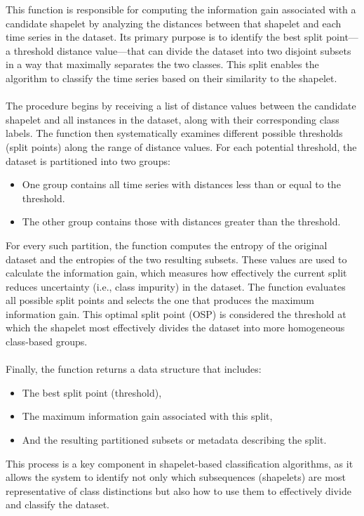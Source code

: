 \noindent This function is responsible for computing the information gain associated with a candidate shapelet by analyzing the distances between that shapelet and each time series in the dataset. Its primary purpose is to identify the best split point—a threshold distance value—that can divide the dataset into two disjoint subsets in a way that maximally separates the two classes. This split enables the algorithm to classify the time series based on their similarity to the shapelet.\\
\\
The procedure begins by receiving a list of distance values between the candidate shapelet and all instances in the dataset, along with their corresponding class labels. The function then systematically examines different possible thresholds (split points) along the range of distance values. For each potential threshold, the dataset is partitioned into two groups:
\begin{itemize}
	\item One group contains all time series with distances less than or equal to the threshold.
	\item The other group contains those with distances greater than the threshold.
\end{itemize}
For every such partition, the function computes the entropy of the original dataset and the entropies of the two resulting subsets. These values are used to calculate the information gain, which measures how effectively the current split reduces uncertainty (i.e., class impurity) in the dataset. The function evaluates all possible split points and selects the one that produces the maximum information gain. This optimal split point (OSP) is considered the threshold at which the shapelet most effectively divides the dataset into more homogeneous class-based groups.\\
\\
Finally, the function returns a data structure that includes: 
\begin{itemize}
	\item The best split point (threshold),
	\item The maximum information gain associated with this split,
	\item And the resulting partitioned subsets or metadata describing the split.
\end{itemize}
This process is a key component in shapelet-based classification algorithms, as it allows the system to identify not only which subsequences (shapelets) are most representative of class distinctions but also how to use them to effectively divide and classify the dataset.\\
